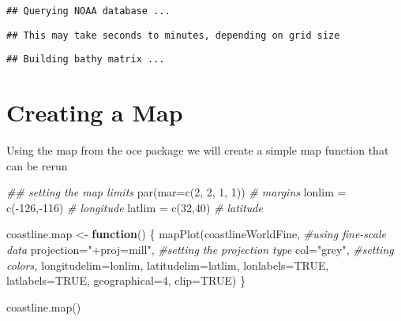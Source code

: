 \documentclass[]{tufte-handout}
\newenvironment{Shaded}{}{}
\newcommand{\AttributeTok}[1]{\textcolor[rgb]{0.49,0.56,0.16}{#1}}
\newcommand{\CommentTok}[1]{\textcolor[rgb]{0.38,0.63,0.69}{\textit{#1}}}
\newcommand{\ConstantTok}[1]{\textcolor[rgb]{0.53,0.00,0.00}{#1}}
\newcommand{\ControlFlowTok}[1]{\textcolor[rgb]{0.00,0.44,0.13}{\textbf{#1}}}
\newcommand{\DecValTok}[1]{\textcolor[rgb]{0.25,0.63,0.44}{#1}}
\newcommand{\DocumentationTok}[1]{\textcolor[rgb]{0.73,0.13,0.13}{\textit{#1}}}
\newcommand{\FunctionTok}[1]{\textcolor[rgb]{0.02,0.16,0.49}{#1}}
\newcommand{\NormalTok}[1]{#1}
\newcommand{\OtherTok}[1]{\textcolor[rgb]{0.00,0.44,0.13}{#1}}
\newcommand{\SpecialCharTok}[1]{\textcolor[rgb]{0.25,0.44,0.63}{#1}}
\newcommand{\StringTok}[1]{\textcolor[rgb]{0.25,0.44,0.63}{#1}}
\begin{document}
\begin{verbatim}
## Querying NOAA database ...
\end{verbatim}

\begin{verbatim}
## This may take seconds to minutes, depending on grid size
\end{verbatim}

\begin{verbatim}
## Building bathy matrix ...
\end{verbatim}

\hypertarget{creating-a-map}{%
\section{Creating a Map}\label{creating-a-map}}

Using the map from the oce package we will create a simple map function
that can be rerun

\begin{Shaded}
\begin{Highlighting}[]
\DocumentationTok{\#\# setting the map limits}
\FunctionTok{par}\NormalTok{(}\AttributeTok{mar=}\FunctionTok{c}\NormalTok{(}\DecValTok{2}\NormalTok{, }\DecValTok{2}\NormalTok{, }\DecValTok{1}\NormalTok{, }\DecValTok{1}\NormalTok{)) }\CommentTok{\# margins}
\NormalTok{lonlim }\OtherTok{=} \FunctionTok{c}\NormalTok{(}\SpecialCharTok{{-}}\DecValTok{126}\NormalTok{,}\SpecialCharTok{{-}}\DecValTok{116}\NormalTok{) }\CommentTok{\# longitude}
\NormalTok{latlim }\OtherTok{=} \FunctionTok{c}\NormalTok{(}\DecValTok{32}\NormalTok{,}\DecValTok{40}\NormalTok{) }\CommentTok{\# latitude}

\NormalTok{coastline.map }\OtherTok{\textless{}{-}} \ControlFlowTok{function}\NormalTok{() \{ }
  \FunctionTok{mapPlot}\NormalTok{(coastlineWorldFine, }\CommentTok{\#using fine{-}scale data}
        \AttributeTok{projection=}\StringTok{"+proj=mill"}\NormalTok{, }\CommentTok{\#setting the projection type}
        \AttributeTok{col=}\StringTok{"grey"}\NormalTok{, }\CommentTok{\#setting colors,}
        \AttributeTok{longitudelim=}\NormalTok{lonlim, }
        \AttributeTok{latitudelim=}\NormalTok{latlim,}
        \AttributeTok{lonlabels=}\ConstantTok{TRUE}\NormalTok{,}
        \AttributeTok{latlabels=}\ConstantTok{TRUE}\NormalTok{,}
        \AttributeTok{geographical=}\DecValTok{4}\NormalTok{,}
        \AttributeTok{clip=}\ConstantTok{TRUE}\NormalTok{)}
\NormalTok{\}}

\FunctionTok{coastline.map}\NormalTok{()}
\end{Highlighting}
\end{Shaded}
\end{document}
